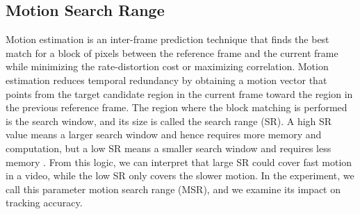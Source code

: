 \subsection{Motion Search Range}
\label{subsec:background/section_c/msr}
Motion estimation is an inter-frame prediction technique that finds the best match for a block of pixels between the reference frame and the current frame while minimizing the rate-distortion cost or maximizing correlation. Motion estimation reduces temporal redundancy by obtaining a motion vector that points from the target candidate region in the current frame toward the region in the previous reference frame. The region where the block matching is performed is the search window, and its size is called the search range (SR). A high SR value means a larger search window and hence requires more memory and computation, but a low SR means a smaller search window and requires less memory \cite{lou_adaptive_2010} \cite{bachu_review_2015}. From this logic, we can interpret that large SR could cover fast motion in a video, while the low SR only covers the slower motion. In the experiment, we call this parameter motion search range (MSR), and we examine its impact on tracking accuracy.